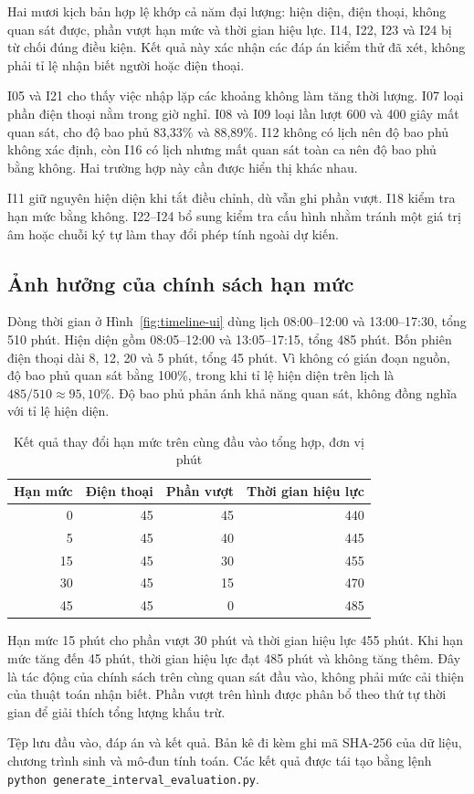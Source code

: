 Hai mươi kịch bản hợp lệ khớp cả năm đại lượng: hiện diện, điện thoại, không quan sát được, phần vượt hạn mức và thời gian hiệu lực. I14, I22, I23 và I24 bị từ chối đúng điều kiện. Kết quả này xác nhận các đáp án kiểm thử đã xét, không phải tỉ lệ nhận biết người hoặc điện thoại.

I05 và I21 cho thấy việc nhập lặp các khoảng không làm tăng thời lượng. I07 loại phần điện thoại nằm trong giờ nghỉ. I08 và I09 loại lần lượt 600 và 400 giây mất quan sát, cho độ bao phủ 83,33\% và 88,89\%. I12 không có lịch nên độ bao phủ không xác định, còn I16 có lịch nhưng mất quan sát toàn ca nên độ bao phủ bằng không. Hai trường hợp này cần được hiển thị khác nhau.

I11 giữ nguyên hiện diện khi tắt điều chỉnh, dù vẫn ghi phần vượt. I18 kiểm tra hạn mức bằng không. I22--I24 bổ sung kiểm tra cấu hình nhằm tránh một giá trị âm hoặc chuỗi ký tự làm thay đổi phép tính ngoài dự kiến.

\subsection{Ảnh hưởng của chính sách hạn mức}
\label{sec:policy-sensitivity}
Dòng thời gian ở Hình~\ref{fig:timeline-ui} dùng lịch 08:00--12:00 và 13:00--17:30, tổng 510 phút. Hiện diện gồm 08:05--12:00 và 13:05--17:15, tổng 485 phút. Bốn phiên điện thoại dài 8, 12, 20 và 5 phút, tổng 45 phút. Vì không có gián đoạn nguồn, độ bao phủ quan sát bằng 100\%, trong khi tỉ lệ hiện diện trên lịch là $485/510\approx95{,}10\%$. Độ bao phủ phản ánh khả năng quan sát, không đồng nghĩa với tỉ lệ hiện diện.

\begin{table}[H]
\centering
\caption{Kết quả thay đổi hạn mức trên cùng đầu vào tổng hợp, đơn vị phút}
\label{tab:allowance-sensitivity}
\begin{tabular}{rrrr}
\toprule
Hạn mức & Điện thoại & Phần vượt & Thời gian hiệu lực\\
\midrule
0 & 45 & 45 & 440\\
5 & 45 & 40 & 445\\
15 & 45 & 30 & 455\\
30 & 45 & 15 & 470\\
45 & 45 & 0 & 485\\
\bottomrule
\end{tabular}
\end{table}

Hạn mức 15 phút cho phần vượt 30 phút và thời gian hiệu lực 455 phút. Khi hạn mức tăng đến 45 phút, thời gian hiệu lực đạt 485 phút và không tăng thêm. Đây là tác động của chính sách trên cùng quan sát đầu vào, không phải mức cải thiện của thuật toán nhận biết. Phần vượt trên hình được phân bổ theo thứ tự thời gian để giải thích tổng lượng khấu trừ.

Tệp  lưu đầu vào, đáp án và kết quả. Bản kê đi kèm ghi mã SHA-256 của dữ liệu, chương trình sinh và mô-đun tính toán. Các kết quả được tái tạo bằng lệnh \texttt{python generate\_interval\_evaluation.py}.

